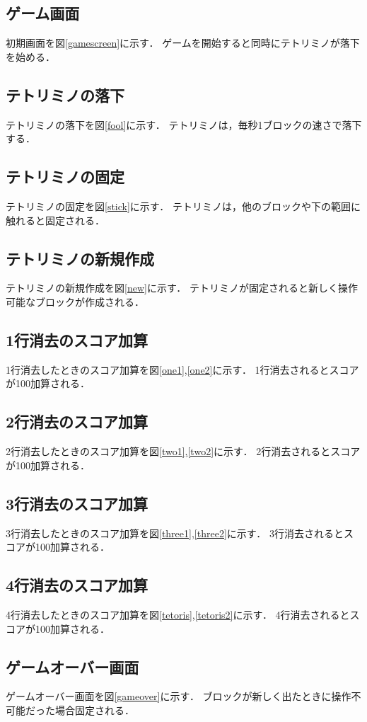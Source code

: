 \subsection{ゲーム画面}
初期画面を図\ref{gamescreen}に示す．
ゲームを開始すると同時にテトリミノが落下を始める．
\subsection{テトリミノの落下}
テトリミノの落下を図\ref{fool}に示す．
テトリミノは，毎秒1ブロックの速さで落下する．
\subsection{テトリミノの固定}
テトリミノの固定を図\ref{stick}に示す．
テトリミノは，他のブロックや下の範囲に触れると固定される．
\subsection{テトリミノの新規作成}
テトリミノの新規作成を図\ref{new}に示す．
テトリミノが固定されると新しく操作可能なブロックが作成される．
\subsection{1行消去のスコア加算}
1行消去したときのスコア加算を図\ref{one1},\ref{one2}に示す．
1行消去されるとスコアが100加算される．
\subsection{2行消去のスコア加算}
2行消去したときのスコア加算を図\ref{two1},\ref{two2}に示す．
2行消去されるとスコアが100加算される．
\subsection{3行消去のスコア加算}
3行消去したときのスコア加算を図\ref{three1},\ref{three2}に示す．
3行消去されるとスコアが100加算される．
\subsection{4行消去のスコア加算}
4行消去したときのスコア加算を図\ref{tetoris},\ref{tetoris2}に示す．
4行消去されるとスコアが100加算される．
\subsection{ゲームオーバー画面}
ゲームオーバー画面を図\ref{gameover}に示す．
ブロックが新しく出たときに操作不可能だった場合固定される．


